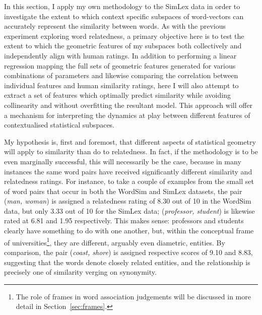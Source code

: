 In this section, I apply my own methodology to the SimLex data in order to investigate the extent to which context specific subspaces of word-vectors can accurately represent the similarity between words.  As with the previous experiment exploring word relatedness, a primary objective here is to test the extent to which the geometric features of my subspaces both collectively and independently align with human ratings.  In addition to performing a linear regression mapping the full sets of geometric features generated for various combinations of parameters and likewise comparing the correlation between individual features and human similarity ratings, here I will also attempt to extract a set of features which optimally predict similarity while avoiding collinearity and without overfitting the resultant model.  This approach will offer a mechanism for interpreting the dynamics at play between different features of contextualised statistical subspaces.

My hypothesis is, first and foremost, that different aspects of statistical geometry will apply to similarity than do to relatedness.  In fact, if the methodology is to be even marginally successful, this will necessarily be the case, because in many instances the same word pairs have received significantly different similarity and relatedness ratings.  For instance, to take a couple of examples from the small set of word pairs that occur in both the WordSim and SimLex datasets, the pair (\emph{man, woman}) is assigned a relatedness rating of 8.30 out of 10 in the WordSim data, but only 3.33 out of 10 for the SimLex data; (\emph{professor, student}) is likewise rated at 6.81 and 1.95 respectively.  This makes sense: professors and students clearly have something to do with one another, but, within the conceptual frame of universities\footnote{The role of frames in word association judgements will be discussed in more detail in Section~\ref{sec:frames}.}, they are different, arguably even diametric, entities.  By comparison, the pair (\emph{coast, shore}) is assigned respective scores of 9.10 and 8.83, suggesting that the words denote closely related entities, and the relationship is precisely one of similarity verging on synonymity.

